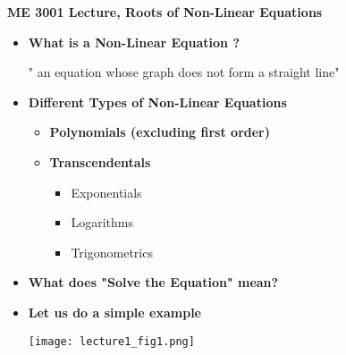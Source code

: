 \documentclass[11pt]{article}
\begin{document}
\textbf{ \LARGE ME 3001 Lecture, Roots of Non-Linear Equations} \\

\begin{itemize}


	\item \textbf{ \LARGE What is a Non-Linear Equation ? }
			
			\Large{" an equation whose graph does not form a straight line"} \\ \vspace{20mm}


	\item \textbf{ \LARGE Different Types of Non-Linear Equations }
		
		\begin{itemize}
			\item \textbf{\Large Polynomials (excluding first order)} \vspace{30mm}
			\item \textbf{\Large Transcendentals} \vspace{10mm}
				\begin{itemize}
					\item Exponentials \vspace{10mm}
					\item Logarithms \vspace{10mm}
					\item Trigonometrics \vspace{20mm}
				\end{itemize}

		\end{itemize}

	\item \textbf{ \LARGE What does "Solve the Equation" mean?}
	\newpage

	\item \textbf{ \LARGE Let us do a simple example} \\
	
		\scalebox{2}{$y = x^2 + 2x - 10$}	 \vspace{30mm}
		
		\texttt{[image: lecture1\_fig1.png]}


\end{itemize}


	
\end{document}
